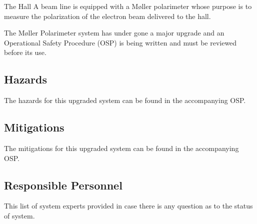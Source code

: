 
The Hall A beam line is equipped with a M{\o}ller 
polarimeter
whose purpose is 
to measure the polarization of the electron beam delivered to the hall. 

%
%
\begin{safetyen}{0}{0}

The M{\o}ller Polarimeter system has under gone a major upgrade and an Operational Safety Procedure (OSP)
is being written and must be reviewed before its use.

\subsection{Hazards}

The hazards for this upgraded system can be found in the accompanying OSP.

\subsection{Mitigations}

The mitigations for this upgraded system can be found in the accompanying OSP.

\subsection{Responsible Personnel}
\label{sec:moller-pers}

This list of system experts provided in case there is any question as to the status of system.


\end{safetyen}
